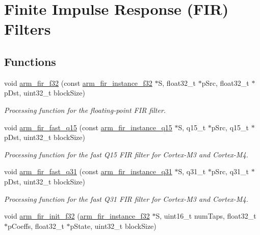 \hypertarget{group___f_i_r}{\section{Finite Impulse Response (F\-I\-R) Filters}
\label{group___f_i_r}
}
\subsection*{Functions}
\begin{DoxyCompactItemize}
\item 
void \hyperlink{group___f_i_r_gae8fb334ea67eb6ecbd31824ddc14cd6a}{arm\-\_\-fir\-\_\-f32} (const \hyperlink{structarm__fir__instance__f32}{arm\-\_\-fir\-\_\-instance\-\_\-f32} $\ast$S, float32\-\_\-t $\ast$p\-Src, float32\-\_\-t $\ast$p\-Dst, uint32\-\_\-t block\-Size)
\begin{DoxyCompactList}\small\item\em Processing function for the floating-\/point F\-I\-R filter. \end{DoxyCompactList}\item 
void \hyperlink{group___f_i_r_gac7d35e9472e49ccd88800f37f3476bd3}{arm\-\_\-fir\-\_\-fast\-\_\-q15} (const \hyperlink{structarm__fir__instance__q15}{arm\-\_\-fir\-\_\-instance\-\_\-q15} $\ast$S, q15\-\_\-t $\ast$p\-Src, q15\-\_\-t $\ast$p\-Dst, uint32\-\_\-t block\-Size)
\begin{DoxyCompactList}\small\item\em Processing function for the fast Q15 F\-I\-R filter for Cortex-\/\-M3 and Cortex-\/\-M4. \end{DoxyCompactList}\item 
void \hyperlink{group___f_i_r_ga55aa292e057b43c376428ea1d9a938cc}{arm\-\_\-fir\-\_\-fast\-\_\-q31} (const \hyperlink{structarm__fir__instance__q31}{arm\-\_\-fir\-\_\-instance\-\_\-q31} $\ast$S, q31\-\_\-t $\ast$p\-Src, q31\-\_\-t $\ast$p\-Dst, uint32\-\_\-t block\-Size)
\begin{DoxyCompactList}\small\item\em Processing function for the fast Q31 F\-I\-R filter for Cortex-\/\-M3 and Cortex-\/\-M4. \end{DoxyCompactList}\item 
void \hyperlink{group___f_i_r_ga98d13def6427e29522829f945d0967db}{arm\-\_\-fir\-\_\-init\-\_\-f32} (\hyperlink{structarm__fir__instance__f32}{arm\-\_\-fir\-\_\-instance\-\_\-f32} $\ast$S, uint16\-\_\-t num\-Taps, float32\-\_\-t $\ast$p\-Coeffs, float32\-\_\-t $\ast$p\-State, uint32\-\_\-t block\-Size)

\end{DoxyCompactItemize}
